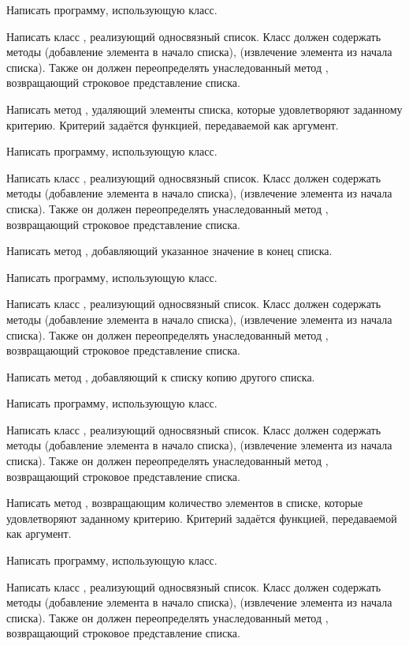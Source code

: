 Написать программу, использующую класс.

\task Написать класс , реализующий односвязный
список. Класс должен содержать методы  (добавление элемента
в начало списка),  (извлечение элемента из начала
списка). Также он должен переопределять унаследованный метод
, возвращающий строковое представление списка.

Написать метод , удаляющий элементы списка, которые
удовлетворяют заданному критерию. Критерий задаётся функцией,
передаваемой как аргумент. 

Написать программу, использующую класс.

\task Написать класс , реализующий односвязный
список. Класс должен содержать методы  (добавление элемента
в начало списка),  (извлечение элемента из начала
списка). Также он должен переопределять унаследованный метод
, возвращающий строковое представление списка.

Написать метод , добавляющий указанное значение в конец
списка.

Написать программу, использующую класс.

\task Написать класс , реализующий односвязный
список. Класс должен содержать методы  (добавление элемента
в начало списка),  (извлечение элемента из начала
списка). Также он должен переопределять унаследованный метод
, возвращающий строковое представление списка.

Написать метод , добавляющий к списку копию другого
списка.

Написать программу, использующую класс.

\task Написать класс , реализующий односвязный
список. Класс должен содержать методы  (добавление элемента
в начало списка),  (извлечение элемента из начала
списка). Также он должен переопределять унаследованный метод
, возвращающий строковое представление списка.

Написать метод , возвращающим количество элементов в
списке, которые удовлетворяют заданному критерию. Критерий задаётся
функцией, передаваемой как аргумент.

Написать программу, использующую класс.

\task Написать класс , реализующий односвязный
список. Класс должен содержать методы  (добавление элемента
в начало списка),  (извлечение элемента из начала
списка). Также он должен переопределять унаследованный метод
, возвращающий строковое представление списка.


